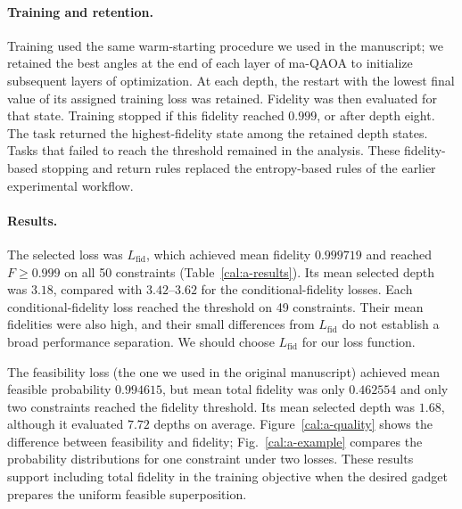 \paragraph{Training and retention.}
Training used the same warm-starting procedure we used in the manuscript; we retained the best angles at the end of each layer of ma-QAOA to initialize subsequent layers of optimization. At each depth, the restart with the lowest final value of its assigned training loss was retained. Fidelity was then evaluated for that state. Training stopped if this fidelity reached $0.999$, or after depth eight. The task returned the highest-fidelity state among the retained depth states. Tasks that failed to reach the threshold remained in the analysis. These fidelity-based stopping and return rules replaced the entropy-based rules of the earlier experimental workflow.

\paragraph{Results.}
The selected loss was $L_{\mathrm{fid}}$, which achieved mean fidelity $0.999719$ and reached $F\geq0.999$ on all 50 constraints (Table~\ref{cal:a-results}). Its mean selected depth was $3.18$, compared with $3.42$--$3.62$ for the conditional-fidelity losses. Each conditional-fidelity loss reached the threshold on 49 constraints. Their mean fidelities were also high, and their small differences from $L_{\mathrm{fid}}$ do not establish a broad performance separation. We should choose $L_{\mathrm{fid}}$ for our loss function.

\begin{table}[tb]
\centering\small
\caption{Study A results across all 50 constraints per loss. Depth columns report the mean selected depth and the mean number of evaluated ma-QAOA depths.}
\label{cal:a-results}
\resizebox{\linewidth}{!}{}
\end{table}

The feasibility loss (the one we used in the original manuscript) achieved mean feasible probability $0.994615$, but mean total fidelity was only $0.462554$ and only two constraints reached the fidelity threshold. Its mean selected depth was $1.68$, although it evaluated $7.72$ depths on average. Figure~\ref{cal:a-quality} shows the difference between feasibility and fidelity; Fig.~\ref{cal:a-example} compares the probability distributions for one constraint under two losses. These results support including total fidelity in the training objective when the desired gadget prepares the uniform feasible superposition.

